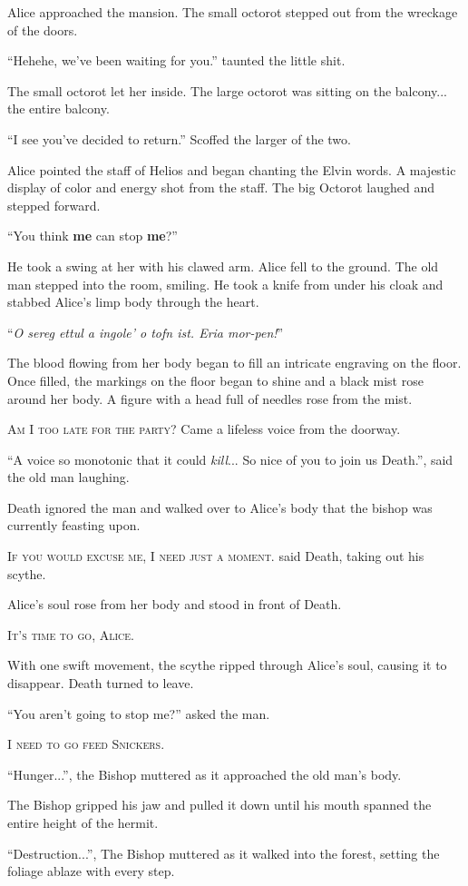 
\noindent
Alice approached the mansion.  The small octorot stepped out from the wreckage of the doors.
\VV


``Hehehe, we've been waiting for you.'' taunted the little shit.
\VV


\noindent
The small octorot let her inside.
The large octorot was sitting on the balcony... the entire balcony.
\VV


``I see you've decided to return.'' Scoffed the larger of the two.
\VV


\noindent
Alice pointed the staff of Helios and began chanting the Elvin words.
A majestic display of color and energy shot from the staff.
The big Octorot laughed and stepped forward.
\VV


``You think \textbf{me} can stop \textbf{me}?''
\VV


\noindent
He took a swing at her with his clawed arm.
Alice fell to the ground.
The old man stepped into the room, smiling.
He took a knife from under his cloak and stabbed Alice's limp body through the heart.
\VV


``\textit{O sereg ettul a ingole' o tofn ist. Eria mor-pen!}''
\VV


\noindent
The blood flowing from her body began to fill an intricate engraving on the floor.
Once filled, the markings on the floor began to shine and a black mist rose around her body.
A figure with a head full of needles rose from the mist.
\VV


\textsc{Am I too late for the party?} Came a lifeless voice from the doorway.


``A voice so monotonic that it could \textit{kill}... So nice of you to join us Death.'',
said the old man laughing.
\VV


\noindent
Death ignored the man and walked over to Alice's body that the bishop was currently feasting upon.
\VV


\textsc{If you would excuse me, I need just a moment.} said Death, taking out his scythe.
\VV


\noindent
Alice's soul rose from her body and stood in front of Death.
\VV


\textsc{It's time to go, Alice.}
\VV


\noindent
With one swift movement, the scythe ripped through Alice's soul, causing it to disappear.
Death turned to leave.
\VV


``You aren't going to stop me?'' asked the man.


\textsc{I need to go feed Snickers.}


``Hunger...'', the Bishop muttered as it approached the old man's body.
\VV


\noindent
The Bishop gripped his jaw and pulled it down until his mouth spanned the entire height of the hermit.
\VV


``Destruction...'', The Bishop muttered as it walked into the forest,
setting the foliage ablaze with every step.
